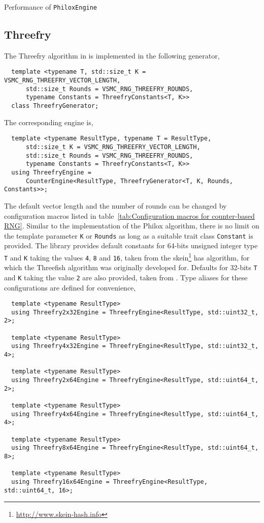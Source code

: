 \begin{table}
  \caption{Performance of \protect\texttt{PhiloxEngine}}
  \label{tab:Performance of PhiloxEngine}
\end{table}

\subsection{Threefry}
\label{sub:Threefry}

The Threefry algorithm in \textcite{Salmon:2011um} is implemented in the
following generator,
\begin{Verbatim}
  template <typename T, std::size_t K = VSMC_RNG_THREEFRY_VECTOR_LENGTH,
      std::size_t Rounds = VSMC_RNG_THREEFRY_ROUNDS,
      typename Constants = ThreefryConstants<T, K>>
  class ThreefryGenerator;
\end{Verbatim}
The corresponding \rng engine is,
\begin{Verbatim}
  template <typename ResultType, typename T = ResultType,
      std::size_t K = VSMC_RNG_THREEFRY_VECTOR_LENGTH,
      std::size_t Rounds = VSMC_RNG_THREEFRY_ROUNDS,
      typename Constants = ThreefryConstants<T, K>>
  using ThreefryEngine =
      CounterEngine<ResultType, ThreefryGenerator<T, K, Rounds, Constants>>;
\end{Verbatim}
The default vector length and the number of rounds can be changed by
configuration macros listed in table~\ref{tab:Configuration macros for
  counter-based RNG}. Similar to the implementation of the Philox algorithm,
there is no limit on the template parameter \verb|K| or \verb|Rounds| as long
as a suitable trait class \verb|Constant| is provided. The library provides
default constants for 64-bits unsigned integer type \verb|T| and \verb|K|
taking the values \verb|4|, \verb|8| and \verb|16|, taken from the
skein\footnote{\url{http://www.skein-hash.info}} has algorithm, for which the
Threefish algorithm was originally developed for. Defaults for 32-bits \verb|T|
and \verb|K| taking the value \verb|2| are also provided, taken from
\textcite{Salmon:2011um}. Type aliases for these configurations are defined for
convenience,
\begin{Verbatim}
  template <typename ResultType>
  using Threefry2x32Engine = ThreefryEngine<ResultType, std::uint32_t, 2>;

  template <typename ResultType>
  using Threefry4x32Engine = ThreefryEngine<ResultType, std::uint32_t, 4>;

  template <typename ResultType>
  using Threefry2x64Engine = ThreefryEngine<ResultType, std::uint64_t, 2>;

  template <typename ResultType>
  using Threefry4x64Engine = ThreefryEngine<ResultType, std::uint64_t, 4>;

  template <typename ResultType>
  using Threefry8x64Engine = ThreefryEngine<ResultType, std::uint64_t, 8>;

  template <typename ResultType>
  using Threefry16x64Engine = ThreefryEngine<ResultType, std::uint64_t, 16>;
\end{Verbatim}
